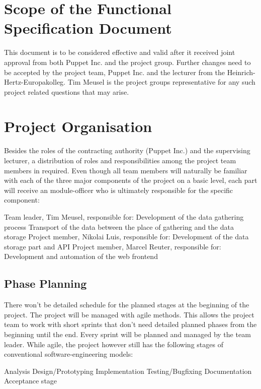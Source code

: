 \section{Scope of the Functional Specification Document}

This document is to be considered effective and valid after it received joint
approval from both Puppet Inc. and the project group. Further changes need to be
accepted by the project team, Puppet Inc. and the lecturer from the
Heinrich-Hertz-Europakolleg. Tim Meusel is the project groups representative for
any such project related questions that may arise.

\section{Project Organisation}

Besides the roles of the contracting authority (Puppet Inc.) and the supervising
lecturer, a distribution of roles and responsibilities among the project team
members in required. Even though all team members will naturally be familiar
with each of the three major components of the project on a basic level, each
part will receive an module-officer who is ultimately responsible for the
specific component:
\begin{outline}
    \1 Team leader, Tim Meusel, responsible for:
        \2 Development of the data gathering process
        \2 Transport of the data between the place of gathering and the data storage
    \1 Project member, Nikolai Luis, responsible for:
        \2 Development of the data storage part and API
    \1 Project member, Marcel Reuter, responsible for:
        \2 Development and automation of the web frontend
\end{outline}

\subsection{Phase Planning}

There won’t be detailed schedule for the planned stages at the beginning of the
project. The project will be managed with agile methods. This allows the project
team to work with short sprints that don’t need detailed planned phases from the
beginning until the end. Every sprint will be planned and managed by the team
leader. While agile, the project however still has the following stages of
conventional software-engineering models:
\begin{outline}
    \1 Analysis
    \1 Design/Prototyping
    \1 Implementation
    \1 Testing/Bugfixing
    \1 Documentation
    \1 Acceptance stage
\end{outline}

